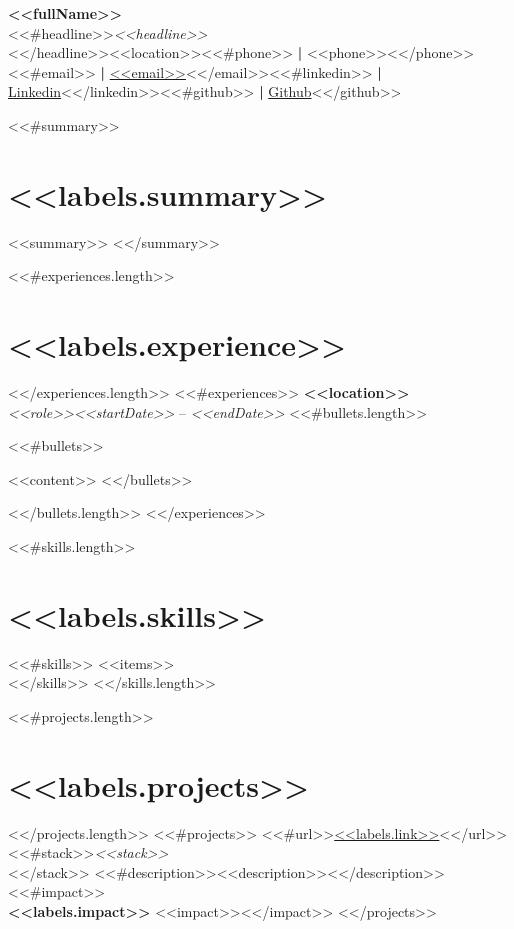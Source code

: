 \documentclass[11pt,a4paper]{article}
\begin{document}
\begin{center}
{\Large\bfseries <<fullName>>}\\[4pt]
<<#headline>>{\itshape <<headline>>}\\[4pt]
<</headline>><<location>><<#phone>> \textbf{|} <<phone>><</phone>><<#email>> \textbf{|} \href{mailto:<<email>>}{<<email>>}<</email>><<#linkedin>> \textbf{|} \href{<<linkedin>>}{Linkedin}<</linkedin>><<#github>> \textbf{|} \href{<<github>>}{Github}<</github>>
\end{center}

<<#summary>>
\section*{<<labels.summary>>}
<<summary>>
<</summary>>

<<#experiences.length>>
\section*{<<labels.experience>>}
<</experiences.length>>
<<#experiences>>
\vspace{2pt}
\hfill{\bfseries <<location>>}\\
{\itshape <<role>>}\hfill{\itshape <<startDate>>} -- {\itshape <<endDate>>}
<<#bullets.length>>
\begin{cvitemize}
<<#bullets>>\item <<content>>
<</bullets>>\end{cvitemize}
<</bullets.length>>
\vspace{4pt}
<</experiences>>

<<#skills.length>>
\section*{<<labels.skills>>}
\vspace{2pt}
<<#skills>> <<items>>\\
<</skills>>
<</skills.length>>

<<#projects.length>>
\section*{<<labels.projects>>}
<</projects.length>>
<<#projects>>
<<#url>>\hfill\href{<<url>>}{<<labels.link>>}<</url>>\\
<<#stack>>{\itshape <<stack>>}\\<</stack>>
<<#description>><<description>><</description>><<#impact>>\\{\bfseries <<labels.impact>>} <<impact>><</impact>>
\vspace{4pt}
<</projects>>
\end{document}
